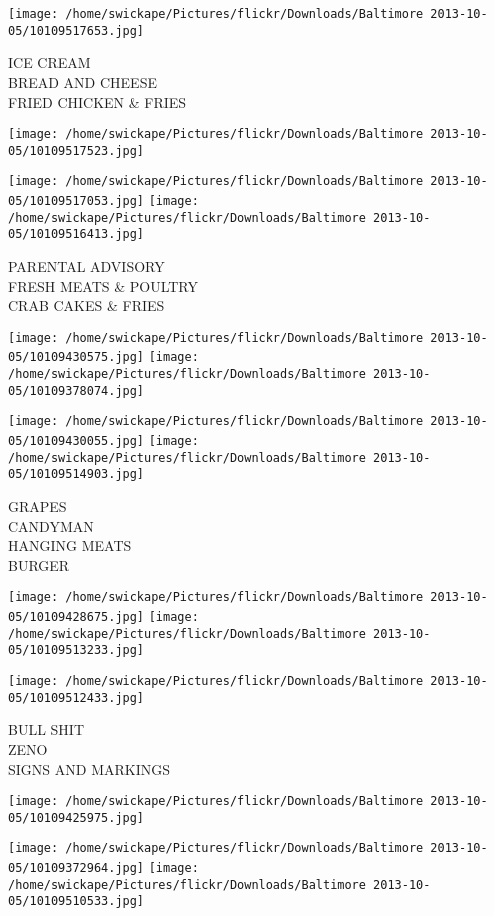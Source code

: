 \documentclass[10pt,letterpaper]{article}
\begin{document}
\texttt{[image: /home/swickape/Pictures/flickr/Downloads/Baltimore 2013-10-05/10109517653.jpg]}

ICE CREAM\\
BREAD AND CHEESE\\
FRIED CHICKEN \& FRIES
\pagebreak

\texttt{[image: /home/swickape/Pictures/flickr/Downloads/Baltimore 2013-10-05/10109517523.jpg]}

\vspace{0.25in}
\texttt{[image: /home/swickape/Pictures/flickr/Downloads/Baltimore 2013-10-05/10109517053.jpg]}
\texttt{[image: /home/swickape/Pictures/flickr/Downloads/Baltimore 2013-10-05/10109516413.jpg]}

PARENTAL ADVISORY\\
FRESH MEATS \& POULTRY\\
CRAB CAKES \& FRIES
\pagebreak

\texttt{[image: /home/swickape/Pictures/flickr/Downloads/Baltimore 2013-10-05/10109430575.jpg]}
\texttt{[image: /home/swickape/Pictures/flickr/Downloads/Baltimore 2013-10-05/10109378074.jpg]}

\texttt{[image: /home/swickape/Pictures/flickr/Downloads/Baltimore 2013-10-05/10109430055.jpg]}
\texttt{[image: /home/swickape/Pictures/flickr/Downloads/Baltimore 2013-10-05/10109514903.jpg]}

GRAPES\\
CANDYMAN\\
HANGING MEATS\\
BURGER
\pagebreak

\texttt{[image: /home/swickape/Pictures/flickr/Downloads/Baltimore 2013-10-05/10109428675.jpg]}
\texttt{[image: /home/swickape/Pictures/flickr/Downloads/Baltimore 2013-10-05/10109513233.jpg]}

\texttt{[image: /home/swickape/Pictures/flickr/Downloads/Baltimore 2013-10-05/10109512433.jpg]}

BULL SHIT\\
ZENO\\
SIGNS AND MARKINGS
\pagebreak

\texttt{[image: /home/swickape/Pictures/flickr/Downloads/Baltimore 2013-10-05/10109425975.jpg]}

\vspace{0.25in}
\texttt{[image: /home/swickape/Pictures/flickr/Downloads/Baltimore 2013-10-05/10109372964.jpg]}
\texttt{[image: /home/swickape/Pictures/flickr/Downloads/Baltimore 2013-10-05/10109510533.jpg]}
\end{document}
